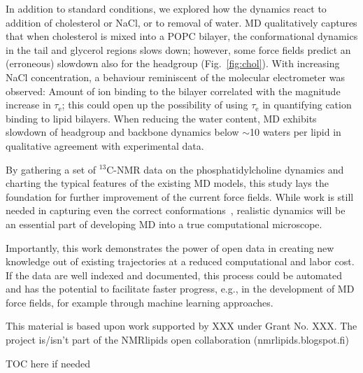 \documentclass[journal=jpcbfk,manuscript=article,layout=twocolumn]{achemso}
\begin{document}

In addition to standard conditions, we explored how the dynamics react to addition of cholesterol or NaCl, or to removal of water.
%
MD qualitatively captures that when cholesterol is mixed into a POPC bilayer, the conformational dynamics in the tail and glycerol regions slows down; however, some force fields predict an (erroneous) slowdown also for the headgroup (Fig.~\ref{fig:chol}).
%
With increasing NaCl concentration, a behaviour reminiscent of the molecular electrometer was observed: Amount of ion binding to the bilayer correlated with the magnitude increase in $\tau_\mathrm e$; this could open up the possibility of using $\tau_\mathrm e$ in quantifying cation binding to lipid bilayers.
%
When reducing the water content, MD exhibits slowdown of headgroup and backbone dynamics below $\sim$10 waters per lipid in qualitative agreement with experimental data. 

By gathering a set of $^{13}$C-NMR data on the phosphatidylcholine dynamics and charting the typical features of the existing MD models, this study lays the foundation for further improvement of the current force fields. While work is still needed in capturing even the correct conformations~\cite{botan15}, realistic dynamics will be an essential part of developing MD into a true computational microscope.

Importantly, this work demonstrates the power of open data in creating new knowledge out of existing trajectories at a reduced computational and labor cost. %
If the data are well indexed and documented, this process could be automated and has the potential to facilitate faster progress, e.g., in the development of MD force fields, for example through machine learning approaches.


\acknowledgement
  This material is based upon work supported by XXX under Grant No. XXX. The project is/isn't part of the NMRlipids open collaboration (nmrlipids.blogspot.fi)



\begin{tocentry}
 TOC here if needed
\end{tocentry}
\end{document}
